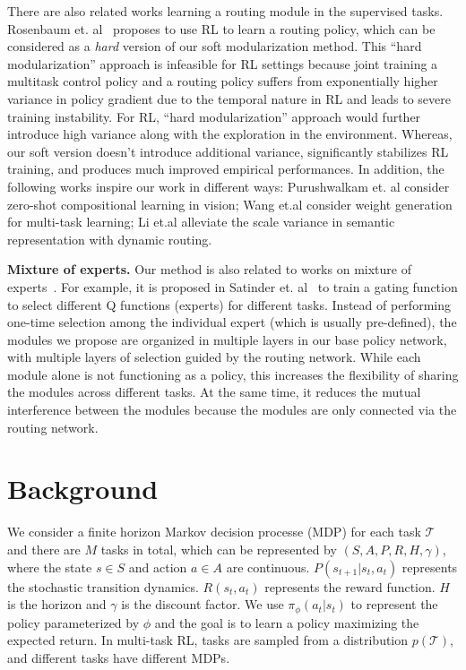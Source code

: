 \documentclass{article}
\newcommand{\task}{\mathcal{T}}
\begin{document}
There are also related works learning a routing module in the supervised tasks.  Rosenbaum et. al~\cite{rosenbaum2017routing,rosenbaum2019routing} proposes to use RL to learn a routing policy, which can be considered as a \emph{hard} version of our soft modularization method. This ``hard modularization'' approach is infeasible for RL settings because joint training a multitask control policy and a routing policy suffers from exponentially higher variance in policy gradient due to the temporal nature in RL and leads to severe training instability. For RL, ``hard modularization'' approach would further introduce high variance along with the exploration in the environment. Whereas, our soft version doesn't introduce additional variance, significantly stabilizes RL training, and produces much improved empirical performances. In addition, the following works inspire our work in different ways:  Purushwalkam et. al \cite{purushwalkam2019task} consider zero-shot compositional learning in vision; Wang et.al \cite{wang2019tafe} consider weight generation for multi-task learning; Li et.al \cite{li2020learning} alleviate the scale variance in semantic representation with dynamic routing.

\textbf{Mixture of experts.} Our method is also related to works on mixture of experts~\cite{MI1993,gomi1993,jacobs1991,singh1992transfer,NIPS1993_750,Ma2018MMoE}. For example, it is proposed in Satinder et. al~\cite{singh1992transfer} to train a gating function to select different Q functions (experts) for different tasks. Instead of performing one-time selection among the individual expert (which is usually pre-defined), the modules we propose are organized in multiple layers in our base policy network, with multiple layers of selection guided by the routing network. While each module alone is not functioning as a policy, this increases the flexibility of sharing the modules across different tasks. At the same time, it reduces the mutual interference between the modules because the modules are only connected via the routing network. 

 
\vspace{-0.1in}
\section{Background}\label{sec:background}
\vspace{-0.1in}
We consider a finite horizon Markov decision processe (MDP) for each task $\task$ and there are $M$ tasks in total, which can be represented by $(S, A, P, R, H, \gamma)$, where the state $s \in S$ and action $a \in A$ are continuous. $P(s_{t+1}|s_t, a_t)$ represents the stochastic transition dynamics. $R(s_t, a_t)$ represents the reward function. $H$ is the horizon and  $\gamma$ is the discount factor. We use $\pi_\phi (a_t|s_t)$ to represent the policy parameterized by $\phi$
and the goal is to learn a policy maximizing the expected return.
In multi-task RL, tasks are sampled from a distribution $p(\task)$, and different tasks have different MDPs. 
\end{document}

